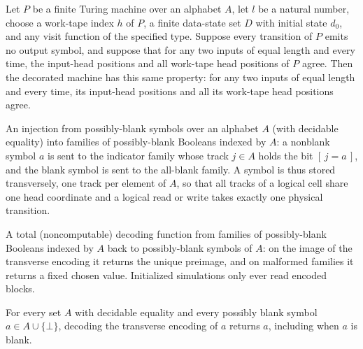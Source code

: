 \begin{lemma}
\label{Complexity.decorateTM_oblivious}
\leanok
{}
Let $P$ be a finite Turing machine over an alphabet $A$, let $l$ be a natural number,
choose a work-tape index $h$ of $P$, a finite data-state set $D$ with initial state
$d_0$, and any visit function of the specified type. Suppose every transition of $P$
emits no output symbol, and suppose that for any two inputs of equal length and every
time, the input-head positions and all work-tape head positions of $P$ agree. Then the
decorated machine has this same property: for any two inputs of equal length and every
time, its input-head positions and all its work-tape head positions agree.
\end{lemma}

\begin{definition}
\label{Complexity.parallelCode}
\leanok
An injection from possibly-blank symbols over an alphabet $A$ (with decidable
equality) into families of possibly-blank Booleans indexed by $A$: a nonblank symbol
$a$ is sent to the indicator family whose track $j \in A$ holds the bit
$[\,j = a\,]$, and the blank symbol is sent to the all-blank family. A symbol is thus
stored transversely, one track per element of $A$, so that all tracks of a logical
cell share one head coordinate and a logical read or write takes exactly one physical
transition.
\end{definition}

\begin{definition}
\label{Complexity.parallelDecode}
\leanok
{}
A total (noncomputable) decoding function from families of possibly-blank Booleans
indexed by $A$ back to possibly-blank symbols of $A$: on the image of the transverse
encoding it returns the unique preimage, and on malformed families it returns a fixed
chosen value. Initialized simulations only ever read encoded blocks.
\end{definition}

\begin{lemma}
\label{Complexity.parallelDecode_code}
\leanok
{}
For every set $A$ with decidable equality and every possibly blank symbol $a\in
A\cup\{\bot\}$, decoding the transverse encoding of $a$ returns $a$, including when $a$
is blank.
\end{lemma}

